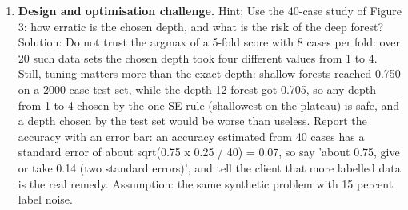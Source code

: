 \documentclass[11pt,a4paper]{article}
\begin{document}
\begin{enumerate}[nosep]
\item \textbf{Design and optimisation challenge.} Hint: Use the 40-case study of Figure 3: how erratic is the chosen depth, and what is the risk of the deep forest? Solution: Do not trust the argmax of a 5-fold score with 8 cases per fold: over 20 such data sets the chosen depth took four different values from 1 to 4. Still, tuning matters more than the exact depth: shallow forests reached 0.750 on a 2000-case test set, while the depth-12 forest got 0.705, so any depth from 1 to 4 chosen by the one-SE rule (shallowest on the plateau) is safe, and a depth chosen by the test set would be worse than useless. Report the accuracy with an error bar: an accuracy estimated from 40 cases has a standard error of about sqrt(0.75 x 0.25 / 40) = 0.07, so say 'about 0.75, give or take 0.14 (two standard errors)', and tell the client that more labelled data is the real remedy. Assumption: the same synthetic problem with 15 percent label noise.
\end{enumerate}
\end{document}
